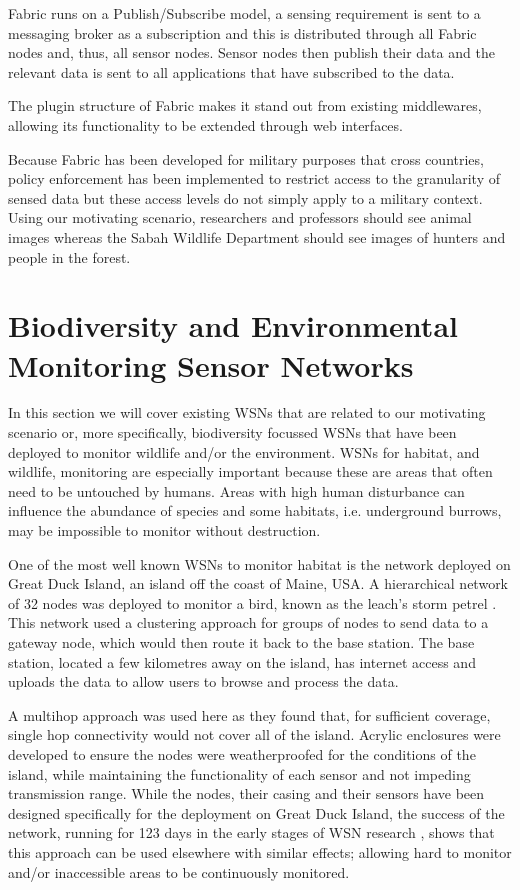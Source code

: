 Fabric runs on a Publish/Subscribe model, a sensing requirement is sent to a messaging broker as a subscription and this is distributed through all Fabric nodes and, thus, all sensor nodes. Sensor nodes then publish their data and the relevant data is sent to all applications that have subscribed to the data. 

The plugin structure of Fabric makes it stand out from existing middlewares, allowing its functionality to be extended through web interfaces.

Because Fabric has been developed for military purposes that cross countries, policy enforcement has been implemented to restrict access to the granularity of sensed data but these access levels do not simply apply to a military context. Using our motivating scenario, researchers and professors should see animal images whereas the Sabah Wildlife Department should see images of hunters and people in the forest.


\section{Biodiversity and Environmental Monitoring Sensor Networks} \label{bg:bsn}
	In this section we will cover existing WSNs that are related to our motivating scenario or, more specifically, biodiversity focussed WSNs that have been deployed to monitor wildlife and/or the environment. WSNs for habitat, and wildlife, monitoring are especially important because these are areas that often need to be untouched by humans. Areas with high human disturbance can influence the abundance of species and some habitats, i.e. underground burrows, may be impossible to monitor without destruction. 
	
	One of the most well known WSNs to monitor habitat is the network deployed on Great Duck Island, an island off the coast of Maine, USA. A hierarchical network of 32 nodes was deployed to monitor a bird, known as the leach’s storm petrel \cite{Mainwaring2002}. This network used a clustering approach for groups of nodes to send data to a gateway node, which would then route it back to the base station. The base station, located a few kilometres away on the island, has internet access and uploads the data to allow users to browse and process the data.

	A multihop approach was used here as they found that, for sufficient coverage, single hop connectivity would not cover all of the island. Acrylic enclosures were developed to ensure the nodes were weatherproofed for the conditions of the island, while maintaining the functionality of each sensor and not impeding transmission range. While the nodes, their casing and their sensors have been designed specifically for the deployment on Great Duck Island, the success of the network, running for 123 days in the early stages of WSN research \cite{Szewczyk2004c}, shows that this approach can be used elsewhere with similar effects; allowing hard to monitor and/or inaccessible areas to be continuously monitored.

